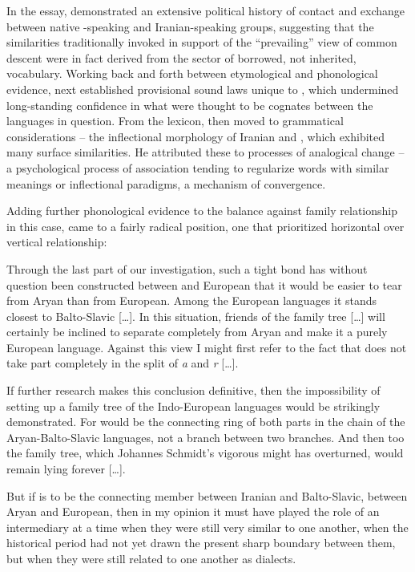 \documentclass[output=paper]{langscibook}
\begin{document}
In the \citeyear{Huebschmann1875} essay, {} demonstrated an extensive political history of contact and exchange between native {\Armenian}-speaking and Iranian-speaking groups, suggesting that the similarities traditionally invoked in support of the ``prevailing'' view of common descent were in fact derived from the sector of borrowed, not inherited, vocabulary. Working back and forth between etymological and phonological evidence, {} next established provisional sound laws unique to {\Armenian}, which undermined long-standing confidence in what were thought to be cognates between the languages in question. From the lexicon, {} then moved to grammatical considerations -- the inflectional morphology of Iranian and {\Armenian}, which exhibited many surface similarities. He attributed these to processes of analogical change -- a psychological process of association tending to regularize words with similar meanings or inflectional paradigms, a mechanism of convergence.

Adding further phonological evidence to the balance against family relationship in this case, {} came to a fairly radical position, one that prioritized horizontal over vertical relationship:

\begin{modquote}
Through the last part of our investigation, such a tight bond has without question been constructed between {\Armenian} and European that it would be easier to tear {\Armenian} from Aryan than from European. Among the European languages it stands closest to Balto-Slavic […]. In this situation, friends of the family tree […] will certainly be inclined to separate {\Armenian} completely from Aryan and make it a purely European language. Against this view I might first refer to the fact that {\Armenian} does not take part completely in the split of \emph{a} and \emph{r} […].

If further research makes this conclusion definitive, then the impossibility of setting up a family tree of the Indo-European languages would be strikingly demonstrated. For {\Armenian} would be the connecting ring of both parts in the chain of the Aryan-Balto-Slavic languages, not a branch between two branches. And then too the family tree, which Johannes Schmidt's vigorous might has overturned, would remain lying forever […].

But if {\Armenian} is to be the connecting member between Iranian and Balto-Slavic, between Aryan and European, then in my opinion it must have played the role of an intermediary at a time when they were still very similar to one another, when the historical period had not yet drawn the present sharp boundary between them, but when they were still related to one another as dialects. \citep[183]{Huebschmann1875}
\end{modquote}
\end{document}
